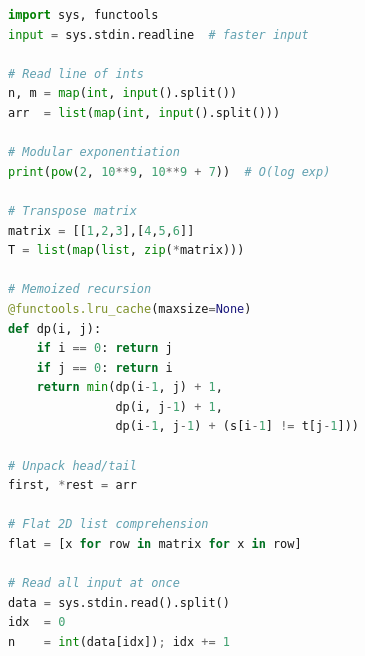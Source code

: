 \begin{lstlisting}[language=Python]
import sys, functools
input = sys.stdin.readline  # faster input

# Read line of ints
n, m = map(int, input().split())
arr  = list(map(int, input().split()))

# Modular exponentiation
print(pow(2, 10**9, 10**9 + 7))  # O(log exp)

# Transpose matrix
matrix = [[1,2,3],[4,5,6]]
T = list(map(list, zip(*matrix)))

# Memoized recursion
@functools.lru_cache(maxsize=None)
def dp(i, j):
    if i == 0: return j
    if j == 0: return i
    return min(dp(i-1, j) + 1,
               dp(i, j-1) + 1,
               dp(i-1, j-1) + (s[i-1] != t[j-1]))

# Unpack head/tail
first, *rest = arr

# Flat 2D list comprehension
flat = [x for row in matrix for x in row]

# Read all input at once
data = sys.stdin.read().split()
idx  = 0
n    = int(data[idx]); idx += 1
\end{lstlisting}